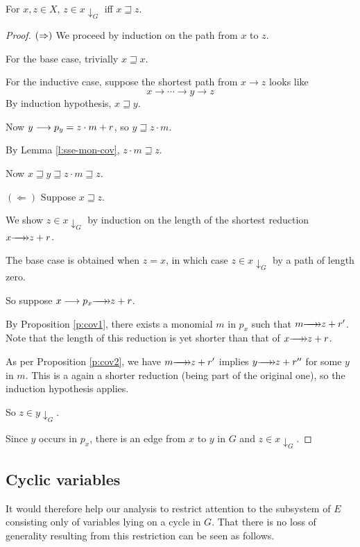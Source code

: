 \documentclass[numbers=enddot]{scrartcl}
\newcommand{\downg}[1]{{#1}{\downarrow_G}}
\newcommand{\cov}{\sqsupseteq}
\newcommand{\LA}{\Leftarrow}
\begin{document}
\begin{lemma} \label{l:path-covers}
    For $x,z \in X$, $z \in \downg{x}$ iff $x \cov z$.
\end{lemma}
\begin{proof}
$(\Rightarrow)$
We proceed by induction on the path from $x$ to $z$.

For the base case, trivially $x \cov x$.

For the inductive case, suppose the shortest path from $x \to z$ looks like 
\[ x \to \cdots \to y \to z\]
By induction hypothesis, $x \cov y$.

Now $y \mathrel{\longrightarrow} p_y = z \cdot m + r$, so $y \cov z \cdot m$.

By Lemma \ref{l:sse-mon-cov}, $z \cdot m \cov z$. 

Now $x \cov y \cov z \cdot m \cov z$. 

$(\LA)$ Suppose $x \cov z$.

We show $z \in \downg{x}$ by induction on the length of the shortest reduction $x \thra z + r$.

The base case is obtained when $z = x$, in which case $z \in \downg{x}$ by a path of length zero.

So suppose $x \lra p_x \thra z + r$. 

By Proposition \ref{p:cov1}, there exists a monomial $m$ in $p_x$ such that $m \thra z + r'$.
Note that the length of this reduction is yet shorter than that of $x \thra z + r$.

As per Proposition \ref{p:cov2}, we have $m \thra z + r'$ implies $y \thra z + r''$ for some $y$ in $m$.
This is a again a shorter reduction (being part of the original one), so the induction hypothesis applies.

So $z \in \downg{y}$.

Since $y$ occurs in $p_x$, there is an edge from $x$ to $y$ in $G$ and $z \in \downg{x}$.
\end{proof}



\subsection{Cyclic variables}
It would therefore help our analysis to restrict attention to the subsystem of
$E$ consisting only of variables lying on a cycle in $G$. That there is no loss of generality
resulting from this restriction can be seen as follows.
\end{document}
